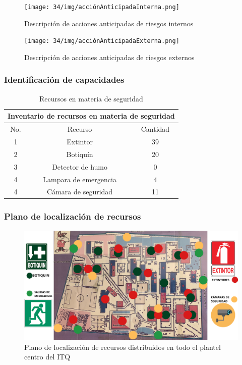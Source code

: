     \begin{figure}[H]
        \centering
        \texttt{[image: 34/img/acciónAnticipadaInterna.png]}
        \caption{Descripción de acciones anticipadas de riesgos internos}
        \label{fig:enter-label11}
    \end{figure}
    
    \begin{figure}[H]
        \centering
        \texttt{[image: 34/img/acciónAnticipadaExterna.png]}
        \caption{Descripción de acciones anticipadas de riesgos externos}
        \label{fig:enter-label12}
    \end{figure}
    
    
    \subsubsection{Identificación de capacidades}
    \begin{table}[H]
        \centering
        \caption{Recursos en materia de seguridad}
        \begin{tabular}{c c c}
        \hline
        \multicolumn{3}{c}{Inventario de recursos en materia de seguridad}\\
        \hline
             No.& Recurso & Cantidad  \\
        \hline
             1& Extintor & 39\\ 
        \hline
             2& Botiquín & 20\\
        \hline
             3& Detector de humo & 0 \\
        \hline
             4& Lampara de emergencia &4  \\  
        \hline
             4& Cámara de seguridad&11 \\
        \hline     
        \end{tabular}
        \label{tab:inventario}
    \end{table}
    
    \subsubsection{Plano de localización de recursos}
    \begin{figure}[H]
        \centering
        \includegraphics[scale=0.21]{34/img/planoRecursos.png}
        \caption{Plano de localización de recursos distribuidos en todo el plantel centro del ITQ}
        \label{fig:enter-plano}
    \end{figure}
    
